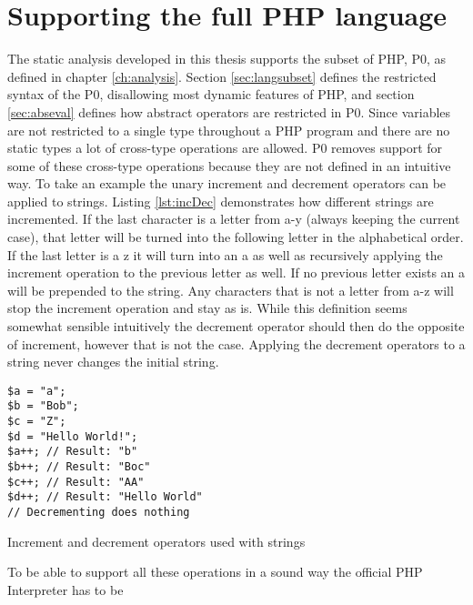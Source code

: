 \section{Supporting the full PHP language}
The static analysis developed in this thesis supports the subset of PHP, P0, as defined in chapter \ref{ch:analysis}.
Section \ref{sec:langsubset} defines the restricted syntax of the P0, disallowing most dynamic features of PHP, and section \ref{sec:abseval} defines how abstract operators are restricted in P0. Since variables are not restricted to a single type throughout a PHP program and there are no static types a lot of cross-type operations are allowed. P0 removes support for some of these cross-type operations because they are not defined in an intuitive way. To take an example the unary increment and decrement operators can be applied to strings. Listing \ref{lst:incDec} demonstrates how different strings are incremented. If the last character is a letter from a-y (always keeping the current case), that letter will be turned into the following letter in the alphabetical order. If the last letter is a z it will turn into an a as well as recursively applying the increment operation to the previous letter as well. If no previous letter exists an a will be prepended to the string. Any characters that is not a letter from a-z will stop the increment operation and stay as is. While this definition seems somewhat sensible intuitively the decrement operator should then do the opposite of increment, however that is not the case. Applying the decrement operators to a string never changes the initial string.

\begin{program}
\begin{lstlisting}
$a = "a";
$b = "Bob";
$c = "Z";
$d = "Hello World!";
$a++; // Result: "b"
$b++; // Result: "Boc"
$c++; // Result: "AA"
$d++; // Result: "Hello World"
// Decrementing does nothing
\end{lstlisting}
\caption{Increment and decrement operators used with strings}
\label{lst:incDec}
\end{program}

To be able to support all these operations in a sound way the official PHP Interpreter has to be 


